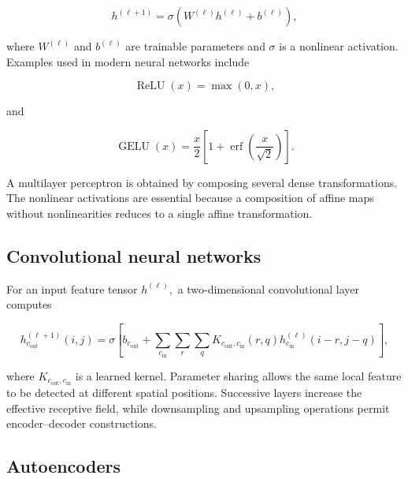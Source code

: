 \begin{equation}
\label{eq:215}
h^{(\ell+1)}=\sigma\left(W^{(\ell)}h^{(\ell)}+b^{(\ell)}\right),
\end{equation}

where \(W^{( \ell )}\) and \(b^{( \ell )}\) are trainable parameters and \(\sigma\) is a nonlinear activation. Examples used in modern neural networks include

\begin{equation}
\label{eq:216}
\operatorname{ReLU}(x)=\max(0,x),
\end{equation}

and

\begin{equation}
\label{eq:217}
\operatorname{GELU}(x)=\frac x2\left[1+\operatorname{erf}\left(\frac{x}{\sqrt2}\right)\right].
\end{equation}

A multilayer perceptron is obtained by composing several dense transformations. The nonlinear activations are essential because a composition of affine maps without nonlinearities reduces to a single affine transformation.

\subsection{Convolutional neural networks}
\label{sec:auxiliary_theoretical_results_convolutional_neural_networks}

For an input feature tensor \(h^{( \ell )} ,\) a two-dimensional convolutional layer computes

\begin{equation}
\label{eq:218}
h_{c_{\mathrm{out}}}^{(\ell+1)}(i,j)=\sigma\left[b_{c_{\mathrm{out}}}+\sum_{c_{\mathrm{in}}}\sum_r\sum_q K_{c_{\mathrm{out}},c_{\mathrm{in}}}(r,q)h_{c_{\mathrm{in}}}^{(\ell)}(i-r,j-q)\right],
\end{equation}

where \(K_{c_{\mathrm{out}} , c_{\mathrm{in}}}\) is a learned kernel. Parameter sharing allows the same local feature to be detected at different spatial positions. Successive layers increase the effective receptive field, while downsampling and upsampling operations permit encoder–decoder constructions.

\subsection{Autoencoders}
\label{sec:auxiliary_theoretical_results_autoencoders}

